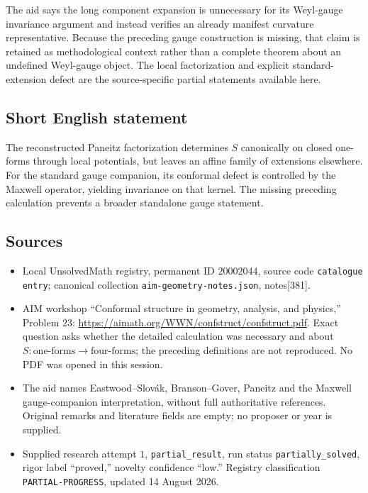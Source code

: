 \documentclass[11pt]{article}
\begin{document}
The aid says the long component expansion is unnecessary for its Weyl-gauge invariance argument and instead verifies an already manifest curvature representative. Because the preceding gauge construction is missing, that claim is retained as methodological context rather than a complete theorem about an undefined Weyl-gauge object. The local factorization and explicit standard-extension defect are the source-specific partial statements available here.
\subsection{Short English statement}
The reconstructed Paneitz factorization determines \(S\) canonically on closed one-forms through local potentials, but leaves an affine family of extensions elsewhere. For the standard gauge companion, its conformal defect is controlled by the Maxwell operator, yielding invariance on that kernel. The missing preceding calculation prevents a broader standalone gauge statement.
\subsection{Sources}
\begin{itemize}
\item Local UnsolvedMath registry, permanent ID \(20002044\), source code \texttt{catalogue entry}; canonical collection \texttt{aim-geometry-notes.json}, notes[381].
\item AIM workshop ``Conformal structure in geometry, analysis, and physics,'' Problem \(23\): \url{https://aimath.org/WWN/confstruct/confstruct.pdf}. Exact question asks whether the detailed calculation was necessary and about \(S:\text{one-forms}\to\text{four-forms}\); the preceding definitions are not reproduced. No PDF was opened in this session.
\item The aid names Eastwood--Slov\'ak, Branson--Gover, Paneitz and the Maxwell gauge-companion interpretation, without full authoritative references. Original remarks and literature fields are empty; no proposer or year is supplied.
\item Supplied research attempt \(1\), \texttt{partial\_result}, run status \texttt{partially\_solved}, rigor label ``proved,'' novelty confidence ``low.'' Registry classification \texttt{PARTIAL-PROGRESS}, updated 14 August 2026.
\end{itemize}
\end{document}

